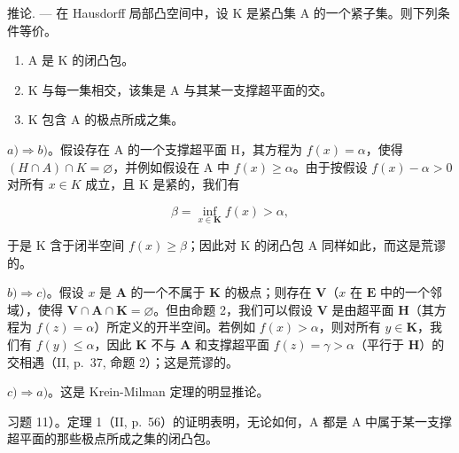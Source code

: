 推论. --- 在 Hausdorff 局部凸空间中，设 K 是紧凸集 A 的一个紧子集。则下列条件等价。

\begin{enumerate}
\def\labelenumi{\alph{enumi})}
\item
  A 是 K 的闭凸包。
\item
  K 与每一集相交，该集是 A 与其某一支撑超平面的交。
\item
  K 包含 A 的极点所成之集。
\end{enumerate}

\(a) \Rightarrow b)\)。假设存在 A 的一个支撑超平面 H，其方程为 \(f(x) = \alpha\)，使得 \((H \cap A) \cap K = \varnothing\)，并例如假设在 A 中 \(f(x) \geqslant \alpha\)。由于按假设 \(f(x) - \alpha > 0\) 对所有 \(x \in K\) 成立，且 K 是紧的，我们有

\[
\beta = \inf _ {x \in \mathbf {K}} f (x) > \alpha ,
\]

于是 K 含于闭半空间 \(f(x) \geqslant \beta\)；因此对 K 的闭凸包 A 同样如此，而这是荒谬的。

\(b) \Rightarrow c)\)。假设 \(x\) 是 \(\mathbf{A}\) 的一个不属于 \(\mathbf{K}\) 的极点；则存在 \(\mathbf{V}\)（\(x\) 在 \(\mathbf{E}\) 中的一个邻域），使得 \(\mathbf{V} \cap \mathbf{A} \cap \mathbf{K} = \varnothing\)。但由命题 2，我们可以假设 \(\mathbf{V}\) 是由超平面 \(\mathbf{H}\)（其方程为 \(f(z) = \alpha\)）所定义的开半空间。若例如 \(f(x) > \alpha\)，则对所有 \(y \in \mathbf{K}\)，我们有 \(f(y) \leqslant \alpha\)，因此 \(\mathbf{K}\) 不与 \(\mathbf{A}\) 和支撑超平面 \(f(z) = \gamma > \alpha\)（平行于 \(\mathbf{H}\)）的交相遇（II, p.~37, 命题 2）；这是荒谬的。

\(c) \Rightarrow a)\)。这是 Krein-Milman 定理的明显推论。

习题 11）。定理 1（II, p.~56）的证明表明，无论如何，A 都是 A 中属于某一支撑超平面的那些极点所成之集的闭凸包。

